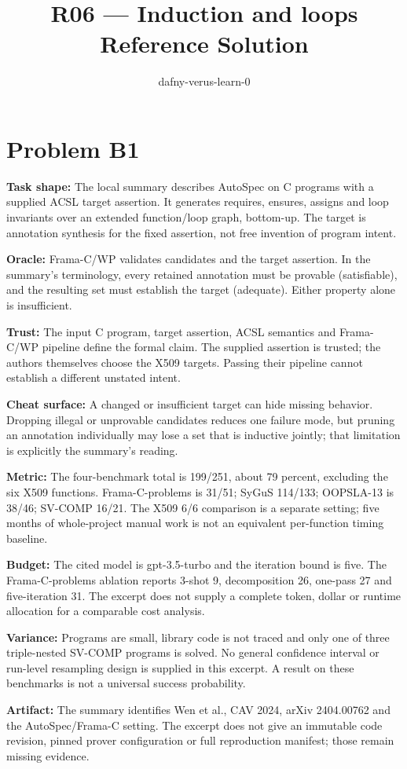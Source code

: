 \documentclass[11pt]{article}
\title{R06 --- Induction and loops \\ \large Reference Solution}
\author{dafny-verus-learn-0}
\date{}
\begin{document}
\maketitle
\section*{Problem B1}\label{ans:B1}
\begin{answer}
\textbf{Task shape:} The local summary describes AutoSpec on C programs with a supplied ACSL target assertion. It generates requires, ensures, assigns and loop invariants over an extended function/loop graph, bottom-up. The target is annotation synthesis for the fixed assertion, not free invention of program intent.

\textbf{Oracle:} Frama-C/WP validates candidates and the target assertion. In the summary's terminology, every retained annotation must be provable (satisfiable), and the resulting set must establish the target (adequate). Either property alone is insufficient.

\textbf{Trust:} The input C program, target assertion, ACSL semantics and Frama-C/WP pipeline define the formal claim. The supplied assertion is trusted; the authors themselves choose the X509 targets. Passing their pipeline cannot establish a different unstated intent.

\textbf{Cheat surface:} A changed or insufficient target can hide missing behavior. Dropping illegal or unprovable candidates reduces one failure mode, but pruning an annotation individually may lose a set that is inductive jointly; that limitation is explicitly the summary's reading.

\textbf{Metric:} The four-benchmark total is 199/251, about 79 percent, excluding the six X509 functions. Frama-C-problems is 31/51; SyGuS 114/133; OOPSLA-13 is 38/46; SV-COMP 16/21. The X509 6/6 comparison is a separate setting; five months of whole-project manual work is not an equivalent per-function timing baseline.

\textbf{Budget:} The cited model is gpt-3.5-turbo and the iteration bound is five. The Frama-C-problems ablation reports 3-shot 9, decomposition 26, one-pass 27 and five-iteration 31. The excerpt does not supply a complete token, dollar or runtime allocation for a comparable cost analysis.

\textbf{Variance:} Programs are small, library code is not traced and only one of three triple-nested SV-COMP programs is solved. No general confidence interval or run-level resampling design is supplied in this excerpt. A result on these benchmarks is not a universal success probability.

\textbf{Artifact:} The summary identifies Wen et al., CAV 2024, arXiv 2404.00762 and the AutoSpec/Frama-C setting. The excerpt does not give an immutable code revision, pinned prover configuration or full reproduction manifest; those remain missing evidence.
\end{answer}
\end{document}
